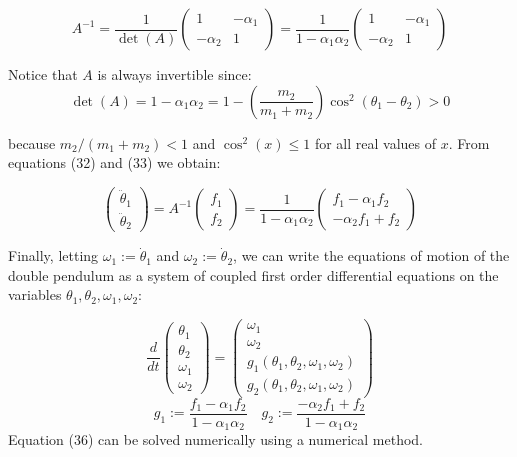 \documentclass[12pt]{article}
\begin{document}
\begin{equation}
    A^{-1} = \frac{1}{\det(A)}\begin{pmatrix}
        1 & -\alpha_1\\
        -\alpha_2 & 1
    \end{pmatrix} = \frac{1}{1-\alpha_1\alpha_2}\begin{pmatrix}
        1 & -\alpha_1\\
        -\alpha_2 & 1
    \end{pmatrix}
\end{equation}

Notice that $A$ is always invertible since:
\begin{equation}
    \det(A) = 1 - \alpha_1\alpha_2 = 1 - \left(\frac{m_2}{m_1 + m_2}\right)\cos^2(\theta_1 - \theta_2) > 0
\end{equation}

because $m_2/(m_1 + m_2) < 1$ and $\cos^2(x) \le 1$ for all real values of $x$. From equations (32) and (33) we obtain:

\begin{equation}
    \begin{pmatrix}
        \ddot\theta_1\\
        \ddot\theta_2
    \end{pmatrix}=A^{-1}\begin{pmatrix}
        f_1\\
        f_2
    \end{pmatrix} = \frac{1}{1-\alpha_1\alpha_2}\begin{pmatrix}
        f_1 - \alpha_1f_2\\
        -\alpha_2f_1 + f_2
    \end{pmatrix}
\end{equation}

Finally, letting $\omega_1 := \dot\theta_1$ and $\omega_2 := \dot\theta_2$, we can write the equations of motion of the double pendulum as a system of coupled first order differential equations on the variables $\theta_1, \theta_2, \omega_1, \omega_2$:

\begin{equation}
    \frac{d}{dt}\begin{pmatrix}
        \theta_1\\
        \theta_2\\
        \omega_1\\
        \omega_2
    \end{pmatrix}=\begin{pmatrix}
        \omega_1\\
        \omega_2\\
        g_1(\theta_1,\theta_2,\omega_1,\omega_2)\\
        g_2(\theta_1,\theta_2,\omega_1,\omega_2)
    \end{pmatrix}
\end{equation}
\begin{equation}
    g_1 := \frac{f_1 - \alpha_1f_2}{1 - \alpha_1\alpha_2} \quad g_2 := \frac{-\alpha_2f_1 + f_2}{1 - \alpha_1\alpha_2}
\end{equation}
Equation (36) can be solved numerically using a numerical method.
\end{document}
